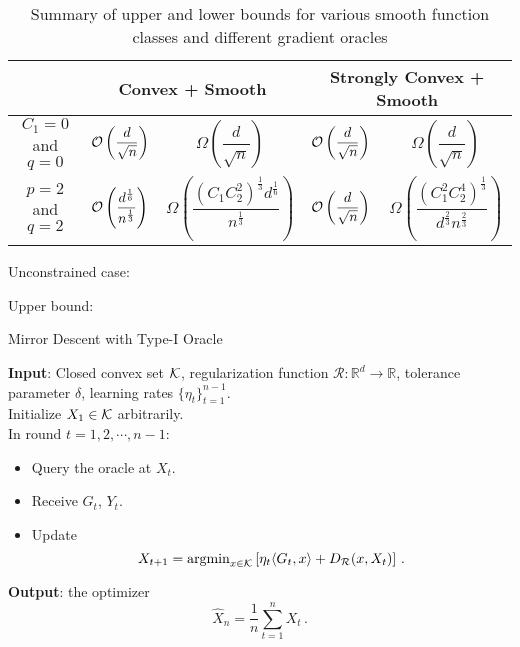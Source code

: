 
\begin{table*}
\centering
 \caption{Summary of upper and lower bounds for various smooth function classes and different gradient oracles}
\label{tab:mse-1}
\begin{tabular}{|c|c|c|c|c|}
\toprule
\rowcolor{gray!20}
  \multirow{2}{*}{\textbf{Oracle type}} & \multicolumn{2}{|c|}{\multirow{2}{*}{\textbf{Convex + Smooth}}} & \multicolumn{2}{|c|}{\multirow{2}{*}{\textbf{Strongly Convex + Smooth}}} \\[1.7em]
 \midrule
\multirow{2}{*}{ $C_1=0$ and $q=0$} & \multirow{2}{*}{$\O\left(\dfrac{d}{\sqrt{n}}\right)$}  & \multirow{2}{*}{$\Omega\left(\dfrac{d}{\sqrt{n}}\right)$} & \multirow{2}{*}{$\O\left(\dfrac{d}{\sqrt{n}}\right)$}  & \multirow{2}{*}{$\Omega\left(\dfrac{d}{\sqrt{n}}\right)$}  \\[1.5em]\midrule
\multirow{2}{*}{ $p=1$ and $q=2$} & \multirow{2}{*}{$\O\left(\dfrac{d^{\frac{1}{4}}}{n^{\frac{1}{4}}}\right)$}  & \multirow{2}{*}{$\Omega\left(\dfrac{\sqrt{C_1 C_2} d^\frac{1}{4}}{n^\frac{1}{4}}\right)$}& \multirow{2}{*}{$\O\left(\dfrac{d}{\sqrt{n}}\right)$}  & \multirow{2}{*}{$\Omega\left(\dfrac{C_1 C_2}{\sqrt{d n}}\right)$} \\[1.5em]\midrule
\multirow{2}{*}{ $p=2$ and $q=2$} & \multirow{2}{*}{$\mathcal{O}\left(\dfrac{d^{\frac{1}{6}}}{n^{\frac{1}{3}}}\right)$}  & \multirow{2}{*}{$\Omega\left(\dfrac{(C_1 C_2^2)^\frac{1}{3} d^\frac{1}{6}}{n^\frac{1}{3}}\right)$} & \multirow{2}{*}{$\O\left(\dfrac{d}{\sqrt{n}}\right)$}  & \multirow{2}{*}{$\Omega\left(\dfrac{(C_1^2 C_2^4)^\frac{1}{3}}{d^\frac{2}{3} n^\frac{2}{3}}\right)$}\\[1.5em]
 \bottomrule 
\end{tabular}
\end{table*}

Unconstrained case:

Upper bound: 

\begin{algorithm}
	\caption{Mirror Descent with Type-I Oracle}\label{alg}
	\textbf{Input}: Closed convex set $\mathcal{K}$, regularization function $\mathcal{R}:\mathbb{R}^d\to \mathbb{R}$, tolerance parameter $\delta$, learning rates $\{\eta_t\}_{t=1}^{n-1}$. \\
	Initialize $X_1\in \mathcal{K}$ arbitrarily.\\
	In round $t=1, 2, \cdots, n-1$:
	\begin{itemize}
	\item Query the oracle at $X_t$.
	\item Receive $G_t$, $Y_t$.
	\item Update
	\[
	X_{t+1}=\operatorname{argmin}_{x\in \mathcal{K}}\left[ \eta_{t} \langle G_t,x \rangle+D_{\mathcal{R}}(x,X_t) \right] \,.
	\]
	\end{itemize}
	\textbf{Output}: the optimizer
	\[
	\hat{X}_n = \dfrac{1}{n}\sum_{t=1}^n X_t \,.
	\]
	
\end{algorithm}

